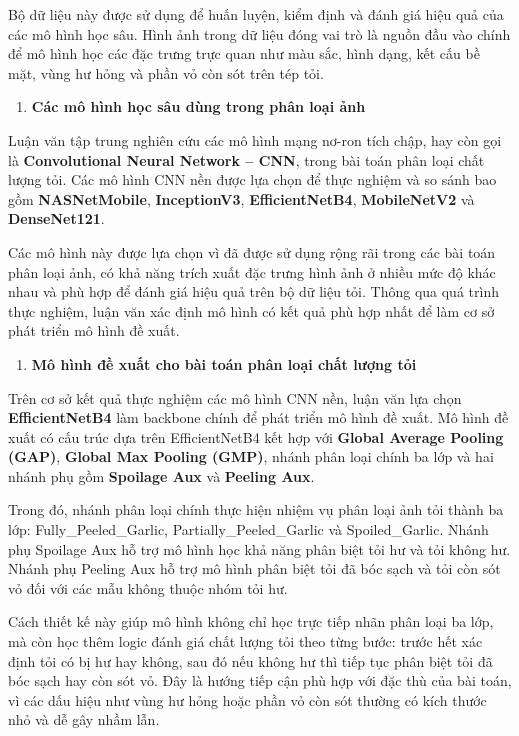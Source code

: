 \documentclass[
]{article}
\begin{document}
Bộ dữ liệu này được sử dụng để huấn luyện, kiểm định và đánh giá hiệu
quả của các mô hình học sâu. Hình ảnh trong dữ liệu đóng vai trò là
nguồn đầu vào chính để mô hình học các đặc trưng trực quan như màu sắc,
hình dạng, kết cấu bề mặt, vùng hư hỏng và phần vỏ còn sót trên tép tỏi.

\begin{enumerate}
\def\labelenumi{\alph{enumi}.}
\setcounter{enumi}{1}
\item
  \textbf{Các mô hình học sâu dùng trong phân loại ảnh}
\end{enumerate}

Luận văn tập trung nghiên cứu các mô hình mạng nơ-ron tích chập, hay còn
gọi là \textbf{Convolutional Neural Network -- CNN}, trong bài toán phân
loại chất lượng tỏi. Các mô hình CNN nền được lựa chọn để thực nghiệm và
so sánh bao gồm \textbf{NASNetMobile}, \textbf{InceptionV3},
\textbf{EfficientNetB4}, \textbf{MobileNetV2} và \textbf{DenseNet121}.

Các mô hình này được lựa chọn vì đã được sử dụng rộng rãi trong các bài
toán phân loại ảnh, có khả năng trích xuất đặc trưng hình ảnh ở nhiều
mức độ khác nhau và phù hợp để đánh giá hiệu quả trên bộ dữ liệu tỏi.
Thông qua quá trình thực nghiệm, luận văn xác định mô hình có kết quả
phù hợp nhất để làm cơ sở phát triển mô hình đề xuất.

\begin{enumerate}
\def\labelenumi{\alph{enumi}.}
\setcounter{enumi}{2}
\item
  \textbf{Mô hình đề xuất cho bài toán phân loại chất lượng tỏi}
\end{enumerate}

Trên cơ sở kết quả thực nghiệm các mô hình CNN nền, luận văn lựa chọn
\textbf{EfficientNetB4} làm backbone chính để phát triển mô hình đề
xuất. Mô hình đề xuất có cấu trúc dựa trên EfficientNetB4 kết hợp với
\textbf{Global Average Pooling (GAP)}, \textbf{Global Max Pooling
(GMP)}, nhánh phân loại chính ba lớp và hai nhánh phụ gồm
\textbf{Spoilage Aux} và \textbf{Peeling Aux}.

Trong đó, nhánh phân loại chính thực hiện nhiệm vụ phân loại ảnh tỏi
thành ba lớp: Fully\_Peeled\_Garlic, Partially\_Peeled\_Garlic và
Spoiled\_Garlic. Nhánh phụ Spoilage Aux hỗ trợ mô hình học khả năng phân
biệt tỏi hư và tỏi không hư. Nhánh phụ Peeling Aux hỗ trợ mô hình phân
biệt tỏi đã bóc sạch và tỏi còn sót vỏ đối với các mẫu không thuộc nhóm
tỏi hư.

Cách thiết kế này giúp mô hình không chỉ học trực tiếp nhãn phân loại ba
lớp, mà còn học thêm logic đánh giá chất lượng tỏi theo từng bước: trước
hết xác định tỏi có bị hư hay không, sau đó nếu không hư thì tiếp tục
phân biệt tỏi đã bóc sạch hay còn sót vỏ. Đây là hướng tiếp cận phù hợp
với đặc thù của bài toán, vì các dấu hiệu như vùng hư hỏng hoặc phần vỏ
còn sót thường có kích thước nhỏ và dễ gây nhầm lẫn.
\end{document}
